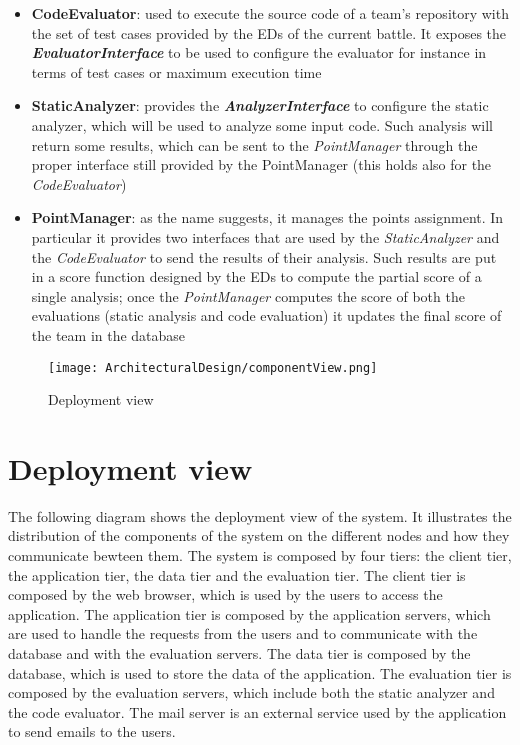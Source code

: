 \begin{itemize}
  \item \textbf{CodeEvaluator}: used to execute the source code of a team's repository with the set of test cases provided by the EDs of the current battle. It exposes the \textbf{\textit{EvaluatorInterface}} to be used to configure the evaluator for instance in terms of test cases or maximum execution time
  \item \textbf{StaticAnalyzer}: provides the \textbf{\textit{AnalyzerInterface}} to configure the static analyzer, which will be used to analyze some input code. Such analysis will return some results, which can be sent to the \textit{PointManager} through the proper interface still provided by the PointManager (this holds also for the \textit{CodeEvaluator})
  \item \textbf{PointManager}: as the name suggests, it manages the points assignment. In particular it provides two interfaces that are used by the \textit{StaticAnalyzer} and the \textit{CodeEvaluator} to send the results of their analysis. Such results are put in a score function designed by the EDs to compute the partial score of a single analysis; once the \textit{PointManager} computes the score of both the evaluations (static analysis and code evaluation) it updates the final score of the team in the database

\end{itemize}

\begin{figure}[H]
    \label{fig:component-view}
    \centering
    \texttt{[image: ArchitecturalDesign/componentView.png]}
    \caption{Deployment view}
\end{figure}
\newpage

\section{Deployment view}
\label{s:deployment-view}%

The following diagram shows the deployment view of the system. It illustrates the distribution of the components of the system on the different nodes and how they communicate bewteen them. The system is composed by four tiers: the client tier, the application tier, the data tier and the evaluation tier. The client tier is composed by the web browser, which is used by the users to access the application. The application tier is composed by the application servers, which are used to handle the requests from the users and to communicate with the database and with the evaluation servers. The data tier is composed by the database, which is used to store the data of the application. The evaluation tier is composed by the evaluation servers, which include both the static analyzer and the code evaluator. The mail server is an external service used by the application to send emails to the users.

